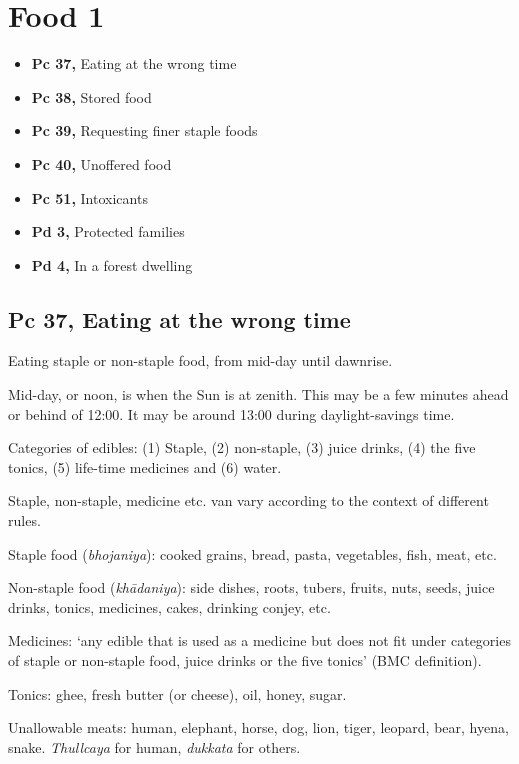 \chapter{Food 1}

\begin{itemize}
\tightlist
\item
  \textbf{Pc 37,} Eating at the wrong time
\item
  \textbf{Pc 38,} Stored food
\item
  \textbf{Pc 39,} Requesting finer staple foods
\item
  \textbf{Pc 40,} Unoffered food
\item
  \textbf{Pc 51,} Intoxicants
\item
  \textbf{Pd 3,} Protected families
\item
  \textbf{Pd 4,} In a forest dwelling
\end{itemize}


\clearpage

\section{Pc 37, Eating at the wrong time}

Eating staple or non-staple food, from mid-day until dawnrise.

Mid-day, or noon, is when the Sun is at zenith. This may be a few
minutes ahead or behind of 12:00. It may be around 13:00 during
daylight-savings time.

Categories of edibles: (1) Staple, (2) non-staple, (3) juice drinks, (4)
the five tonics, (5) life-time medicines and (6) water.

Staple, non-staple, medicine etc. van vary according to the context of
different rules.

Staple food (\emph{bhojaniya}): cooked grains, bread, pasta, vegetables,
fish, meat, etc.

Non-staple food (\emph{khādaniya}): side dishes, roots, tubers, fruits,
nuts, seeds, juice drinks, tonics, medicines, cakes, drinking conjey,
etc.

Medicines: `any edible that is used as a medicine but does not fit under
categories of staple or non-staple food, juice drinks or the five
tonics' (BMC definition).

Tonics: ghee, fresh butter (or cheese), oil, honey, sugar.

Unallowable meats: human, elephant, horse, dog, lion, tiger, leopard,
bear, hyena, snake. \emph{Thullcaya} for human, \emph{dukkata} for
others.

